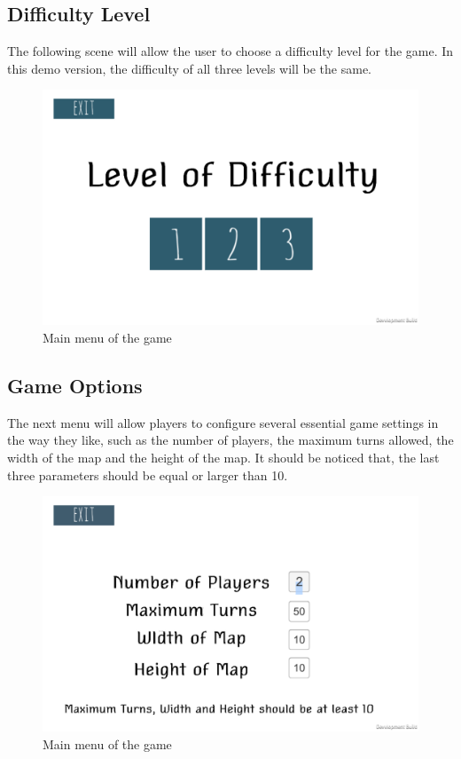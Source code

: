 \documentclass[12pt,a4paper,twoside]{scrartcl}
\begin{document}
\subsection{Difficulty Level}
The following scene will allow the user to choose a difficulty level for the game. In this demo version, the difficulty of all three levels will be the same.
\begin{figure}[h] 
	\centering
	\includegraphics[scale=0.2]{start2}
	\caption{Main menu of the game}
\end{figure}

\subsection{Game Options}
The next menu will allow players to configure several essential game settings in the way they like, such as the number of players, the maximum turns allowed, the width of the map and the height of the map. It should be noticed that, the last three parameters should be equal or larger than 10.

\begin{figure}[h] 
	\centering
	\includegraphics[scale=0.2]{start3}
	\caption{Main menu of the game}
\end{figure}
\end{document}
